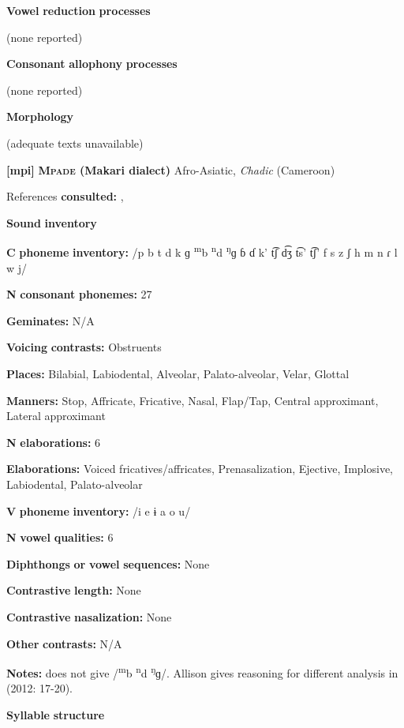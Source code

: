\begin{styleBody}
\textbf{Vowel} \textbf{reduction} \textbf{processes}

(none reported)

\textbf{Consonant} \textbf{allophony} \textbf{processes}

(none reported)

\textbf{Morphology}

(adequate texts unavailable)

\textbf{[mpi]}   \textbf{\textsc{Mpade} \textbf{(Makari} \textbf{dialect)}}  Afro-Asiatic, \textit{Chadic} (Cameroon)

References \textbf{consulted:} \citet{Allison2012}, \citet{Mahamat2005}

\textbf{Sound} \textbf{inventory}

\textbf{C} \textbf{phoneme} \textbf{inventory:} /p b t d k ɡ \textsuperscript{m}b \textsuperscript{n}d \textsuperscript{ŋ}ɡ ɓ ɗ k’ t͡ʃ d͡ʒ t͡s’ t͡ʃ’ f s z ʃ h m n ɾ l w j/

\textbf{N} \textbf{consonant} \textbf{phonemes:} 27

\textbf{Geminates:} N/A

\textbf{Voicing} \textbf{contrasts:} Obstruents

\textbf{Places:} Bilabial, Labiodental, Alveolar, Palato-alveolar, Velar, Glottal

\textbf{Manners:} Stop, Affricate, Fricative, Nasal, Flap/Tap, Central approximant, Lateral approximant

\textbf{N} \textbf{elaborations:} 6

\textbf{Elaborations:} Voiced fricatives/affricates, Prenasalization, Ejective, Implosive, Labiodental, Palato-alveolar

\textbf{V} \textbf{phoneme} \textbf{inventory:} /i e ɨ a o u/

\textbf{N} \textbf{vowel} \textbf{qualities:} 6

\textbf{Diphthongs} \textbf{or} \textbf{vowel} \textbf{sequences:} None

\textbf{Contrastive} \textbf{length:} None

\textbf{Contrastive} \textbf{nasalization:} None

\textbf{Other} \textbf{contrasts:} N/A

\textbf{Notes:} \citet{Mahamat2005} does not give /\textsuperscript{m}b \textsuperscript{n}d \textsuperscript{ŋ}ɡ/. Allison gives reasoning for different analysis in (2012: 17-20).

\textbf{Syllable} \textbf{structure}


\end{styleBody}
